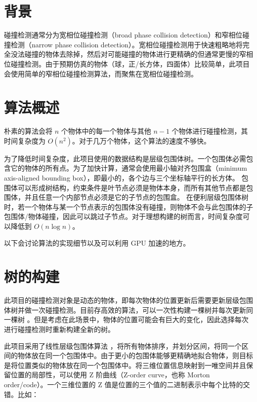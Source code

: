\section{背景}

碰撞检测通常分为宽相位碰撞检测（broad phase collision detection）和窄相位碰撞检测（narrow phase collision detection）\cite{nvidiaCollisionDetection}。宽相位碰撞检测用于快速粗略地将完全没法碰撞的物体去除掉，然后对可能碰撞的物体进行更精确的但通常更慢的窄相位碰撞检测。由于预期仿真的物体（球，正/长方体，四面体）比较简单，此项目会使用简单的窄相位碰撞检测算法，而聚焦在宽相位碰撞检测。

\section{算法概述}

朴素的算法会将 $n$ 个物体中的每一个物体与其他 $n-1$ 个物体进行碰撞检测，其时间复杂度为 $O(n^2)$。对于几万个物体，这个算法的速度不够快。

为了降低时间复杂度，此项目使用的数据结构是层级包围体树。一个包围体必需包含它的物体的所有点。为了加快计算，通常会使用最小轴对齐包围盒（minimum axis-aligned bounding box），即最小的，各个边与三个坐标轴平行的长方体。
包围体可以形成树结构，约束条件是叶节点必须是物体本身，而所有其他节点都是包围体，并且任意一个内部节点必须是它的子节点的包围盒。
在便利层级包围体树时，若一个物体与某一个节点表示的包围体没有碰撞，则物体不会与此包围体的子包围体/物体碰撞，因此可以跳过子节点。对于理想构建的树而言，时间复杂度可以降低到 $O(n\log n)$。

以下会讨论算法的实现细节以及可以利用 GPU 加速的地方。

\section{树的构建}

此项目的碰撞检测对象是动态的物体，即每次物体的位置更新后需要更新层级包围体树并做一次碰撞检测。目前存高效的算法，可以一次性构建一棵树并每次更新同一棵树 \cite{Wald2008}。但是考虑在此场景中，物体的位置可能会有巨大的变化，因此选择每次进行碰撞检测时重新构建全新的树。

此项目采用了线性层级包围体算法 \cite{Lauterbach2009}，将所有物体排序，并划分区间，将同一个区间的物体放在同一个包围体中。由于更小的包围体能够更精确地拟合物体，则目标是将位置类似的物体放在同一个包围体中。将三维位置信息映射到一唯空间并且保留位置的局部性，可以使用 Z 阶曲线（Z-order curve，也称 Morton order/code）\cite{wikipediaZorderCurve}。一个三维位置的 Z 值是位置的三个值的二进制表示中每个比特的交错。比如：

